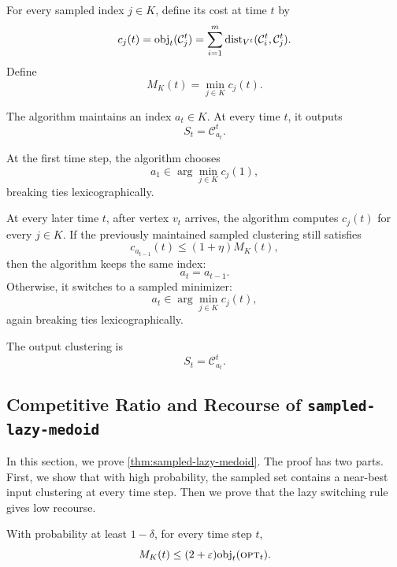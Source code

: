 For every sampled index \(j\in K\), define its cost at time \(t\) by
\[
    c_j(t)
    =
    \text{obj}_t(\mathcal C_j^t)
    =
    \sum_{i=1}^m
    \text{dist}_{V^t}(\mathcal C_i^t,\mathcal C_j^t).
\]
Define
\[
    M_K(t)
    =
    \min_{j\in K} c_j(t).
\]

The algorithm maintains an index \(a_t\in K\). At every time \(t\), it outputs
\[
    S_t=\mathcal C_{a_t}^t.
\]

At the first time step, the algorithm chooses
\[
    a_1\in \arg\min_{j\in K} c_j(1),
\]
breaking ties lexicographically.

At every later time \(t\), after vertex \(v_t\) arrives, the algorithm computes \(c_j(t)\) for every \(j\in K\). If the previously maintained sampled clustering still satisfies
\[
    c_{a_{t-1}}(t)
    \le
    (1+\eta)M_K(t),
\]
then the algorithm keeps the same index:
\[
    a_t=a_{t-1}.
\]
Otherwise, it switches to a sampled minimizer:
\[
    a_t\in \arg\min_{j\in K} c_j(t),
\]
again breaking ties lexicographically.

The output clustering is
\[
    S_t=\mathcal C_{a_t}^t.
\]

\subsection{Competitive Ratio and Recourse of \texttt{sampled-lazy-medoid}}

In this section, we prove \cref{thm:sampled-lazy-medoid}. The proof has two parts. First, we show that with high probability, the sampled set contains a near-best input clustering at every time step. Then we prove that the lazy switching rule gives low recourse.

\begin{lemma}
\label{lem:sample-hits-good}
With probability at least \(1-\delta\), for every time step \(t\),
\[
    M_K(t)
    \le
    (2+\varepsilon)\text{obj}_t(\textsc{opt}_t).
\]
\end{lemma}

